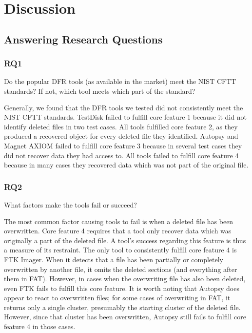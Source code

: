 \section{Discussion}

\subsection{Answering Research Questions}
\subsubsection{RQ1}
Do the popular DFR tools (as available in the market) meet the NIST CFTT standards? 
If not, which tool meets which part of the standard? 

Generally, we found that the DFR tools we tested did not consistently meet the NIST CFTT standards.
TestDisk\cite{testdisk} failed to fulfill core feature 1 because it did not identify deleted files in two test cases.
All tools fulfilled core feature 2, as they produced a recovered object for every deleted file they identified.
Autopsy\cite{autopsy} and Magnet AXIOM\cite{axiom} failed to fulfill core feature 3 because in several test cases they did not recover data they had access to.
All tools failed to fulfill core feature 4 because in many cases they recovered data which was not part of the original file.

\subsubsection{RQ2}
What factors make the tools fail or succeed?

The most common factor causing tools to fail is when a deleted file has been overwritten.
Core feature 4 requires that a tool only recover data which was originally a part of the deleted file.
A tool's success regarding this feature is thus a measure of its restraint.
The only tool to consistently fulfill core feature 4 is FTK Imager.\cite{ftk}
When it detects that a file has been partially or completely overwritten by another file, it omits the deleted sections (and everything after them in FAT).
However, in cases when the overwriting file has also been deleted, even FTK fails to fulfill this core feature.
It is worth noting that Autopsy does appear to react to overwritten files; for some cases of overwriting in FAT, it returns only a single cluster, presumably the starting cluster of the deleted file.
However, since that cluster has been overwritten, Autopsy still fails to fulfill core feature 4 in those cases.

